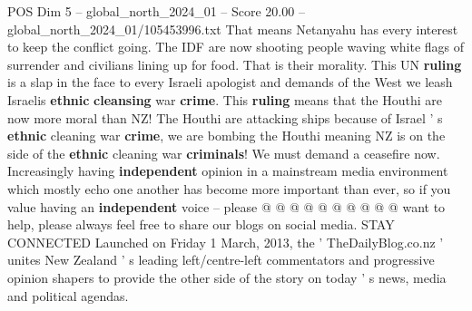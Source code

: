 \begin{textsample}{POS Dim 5 – global\_north\_2024\_01 – Score 20.00 – global\_north\_2024\_01/105453996.txt}
That means Netanyahu has every interest to keep the conflict going.
The IDF are now shooting people waving white flags of surrender and civilians lining up for food.
That is their morality.
This UN \textbf{ruling} is a slap in the face to every Israeli apologist and demands of the West we leash Israelis \textbf{ethnic} \textbf{cleansing} war \textbf{crime}.
This \textbf{ruling} means that the Houthi are now more moral than NZ!
The Houthi are attacking ships because of Israel ' s \textbf{ethnic} cleaning war \textbf{crime}, we are bombing the Houthi meaning NZ is on the side of the \textbf{ethnic} cleaning war \textbf{criminals}!
We must demand a ceasefire now.
Increasingly having \textbf{independent} opinion in a mainstream media environment which mostly echo one another has become more important than ever, so if you value having an \textbf{independent} voice -- please @ @ @ @ @ @ @ @ @ @ want to help, please always feel free to share our blogs on social media.
STAY CONNECTED Launched on Friday 1 March, 2013, the ' TheDailyBlog.co.nz ' unites New Zealand ' s leading left/centre-left commentators and progressive opinion shapers to provide the other side of the story on today ' s news, media and political agendas.

\end{textsample}
